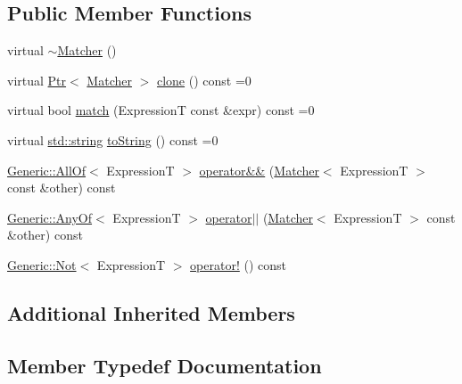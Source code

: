 \subsection*{Public Member Functions}
\begin{DoxyCompactItemize}
\item 
virtual \hyperlink{struct_catch_1_1_matchers_1_1_impl_1_1_matcher_a55e537214a78bbba59f53d3e30336a61}{$\sim$\+Matcher} ()
\item 
virtual \hyperlink{class_catch_1_1_ptr}{Ptr}$<$ \hyperlink{struct_catch_1_1_matchers_1_1_impl_1_1_matcher}{Matcher} $>$ \hyperlink{struct_catch_1_1_matchers_1_1_impl_1_1_matcher_a72c896b9afa03c7e6ac19a0c1d5a634b}{clone} () const  =0
\item 
virtual bool \hyperlink{struct_catch_1_1_matchers_1_1_impl_1_1_matcher_a5c00e663b7b83cbf2e4b3d13d9193309}{match} (ExpressionT const \&expr) const  =0
\item 
virtual \hyperlink{_s_d_l__opengl__glext_8h_ae84541b4f3d8e1ea24ec0f466a8c568b}{std\+::string} \hyperlink{struct_catch_1_1_matchers_1_1_impl_1_1_matcher_afd2469dc5c1869d67d4ad00d3b6388eb}{to\+String} () const  =0
\item 
\hyperlink{class_catch_1_1_matchers_1_1_impl_1_1_generic_1_1_all_of}{Generic\+::\+All\+Of}$<$ ExpressionT $>$ \hyperlink{struct_catch_1_1_matchers_1_1_impl_1_1_matcher_a1d3b73f684611a6a71396caf74427287}{operator\&\&} (\hyperlink{struct_catch_1_1_matchers_1_1_impl_1_1_matcher}{Matcher}$<$ ExpressionT $>$ const \&other) const 
\item 
\hyperlink{class_catch_1_1_matchers_1_1_impl_1_1_generic_1_1_any_of}{Generic\+::\+Any\+Of}$<$ ExpressionT $>$ \hyperlink{struct_catch_1_1_matchers_1_1_impl_1_1_matcher_a2e163b264811ba76638469b537467f9e}{operator$\vert$$\vert$} (\hyperlink{struct_catch_1_1_matchers_1_1_impl_1_1_matcher}{Matcher}$<$ ExpressionT $>$ const \&other) const 
\item 
\hyperlink{class_catch_1_1_matchers_1_1_impl_1_1_generic_1_1_not}{Generic\+::\+Not}$<$ ExpressionT $>$ \hyperlink{struct_catch_1_1_matchers_1_1_impl_1_1_matcher_a534857633dde84924993b674cb248c8f}{operator!} () const 
\end{DoxyCompactItemize}
\subsection*{Additional Inherited Members}


\subsection{Member Typedef Documentation}
